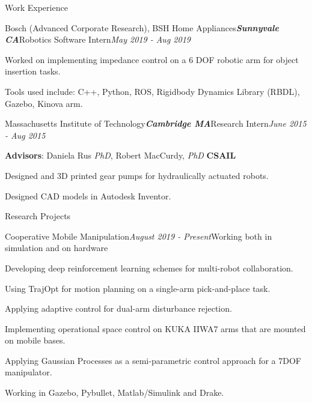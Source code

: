 \documentclass{resume} %
\begin{document}
\begin{rSection}{Work Experience}
\begin{rSubsection}{Bosch (Advanced Corporate Research), BSH Home Appliances}{\bf \em Sunnyvale CA}{Robotics Software Intern}{\em May 2019 - Aug 2019}
\item Worked on implementing impedance control on a 6 DOF robotic arm for object insertion tasks.
\item Tools used include: C++, Python, ROS, Rigidbody Dynamics Library (RBDL), Gazebo, Kinova arm.
\end{rSubsection}

\begin{rSubsection}{Massachusetts Institute of Technology}{\bf \em Cambridge MA}{Research Intern}{\em June 2015 - Aug 2015}
\item {\bf Advisors}: Daniela Rus {\em PhD},   Robert MacCurdy, {\em PhD} \hfill {\bf CSAIL}
\item Designed and 3D printed gear pumps for hydraulically actuated robots.
\item Designed CAD models in Autodesk Inventor.
\end{rSubsection}

\end{rSection}


\begin{rSection}{Research Projects}

\begin{rSubsection}{Cooperative Mobile Manipulation}{\em August 2019 - Present}{Working both in simulation and on hardware}{}
\item Developing deep reinforcement learning schemes for multi-robot collaboration.
\item Using TrajOpt for motion planning on a single-arm pick-and-place task.
\item Applying adaptive control for dual-arm disturbance rejection.
\item Implementing operational space control on KUKA IIWA7 arms that are mounted on mobile bases.
\item Applying Gaussian Processes as a semi-parametric control approach for a 7DOF manipulator.
\item Working in Gazebo, Pybullet, Matlab/Simulink and Drake.
\end{rSubsection}

\end{rSection}
\end{document}
